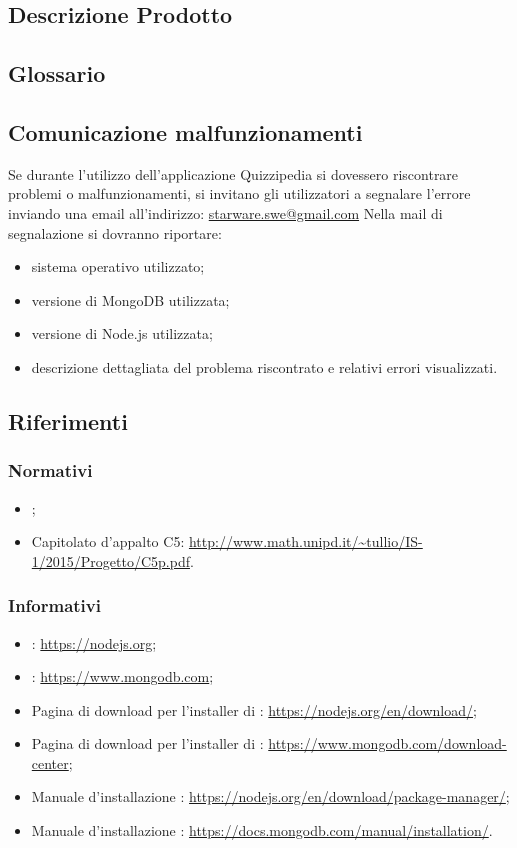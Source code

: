 \documentclass[12pt,a4paper]{article}
\begin{document}
	
	\subsection{Descrizione Prodotto}
	\descrizioneProdotto
	
	\subsection{Glossario}
	\glossarioManualiPrint
	\subsection{Comunicazione malfunzionamenti}
		Se durante l’utilizzo dell’applicazione Quizzipedia si dovessero riscontrare problemi o malfunzionamenti, si invitano gli utilizzatori a segnalare l’errore inviando una email 		all’indirizzo:
		\url{starware.swe@gmail.com}
		Nella mail di segnalazione si dovranno riportare:
		\begin{itemize}
			\item sistema operativo utilizzato;
			\item versione di MongoDB utilizzata;
			\item versione di Node.js utilizzata;
			\item descrizione dettagliata del problema riscontrato e relativi errori visualizzati.
		\end{itemize}
	\subsection{Riferimenti}
	
	\subsubsection{Normativi}
	\begin{itemize}
		\item \NdPv{};
		\item Capitolato d'appalto C5: \url{http://www.math.unipd.it/~tullio/IS-1/2015/Progetto/C5p.pdf}.
	\end{itemize}	
	\subsubsection{Informativi}
	\begin{itemize}
		\item {}: \url{https://nodejs.org};
		\item {}: \url{https://www.mongodb.com};
		\item Pagina di download per l'installer di :
		\url{https://nodejs.org/en/download/};
		\item Pagina di download per l'installer di :
		\url{https://www.mongodb.com/download-center};
		\item Manuale d'installazione :
		\url{https://nodejs.org/en/download/package-manager/};
		\item Manuale d'installazione :
		\url{https://docs.mongodb.com/manual/installation/}.
		
	\end{itemize}	
	
\end{document}
